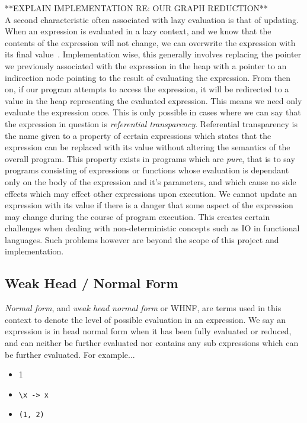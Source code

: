 **EXPLAIN IMPLEMENTATION RE: OUR GRAPH REDUCTION**  \\


A second characteristic often associated with lazy evaluation is that of 
updating. When an expression is evaluated in a lazy context, and we know
that the contents of the expression will not change, we can overwrite the
expression with its final value~\cite[pp.208]{SPJ}. Implementation wise, this generally involves
replacing the pointer we previously associated with the expression in the
heap with a pointer to an indirection node pointing to the result of 
evaluating the expression. From then on, if our program attempts to 
access the expression, it will be redirected to a value in the heap 
representing the evaluated expression. This means we need only evaluate
the expression once. This is only possible in cases where
we can say that the expression in question is \emph{referential transparency}. 
Referential transparency is the name
given to a property of certain expressions which states that the expression
can be replaced with its value without altering the semantics of the overall
program. This property exists in programs which are \emph{pure}, that is to
say programs consisting of expressions or functions whose evaluation is 
dependant only on the body of the expression and it's parameters, and which
cause no side effects which may effect other expressions upon execution. 
We cannot update an expression with its value if there is a danger that
some aspect of the expression may change during the course of program 
execution. This creates certain challenges when dealing with non-deterministic
concepts such as IO in functional languages. Such problems however are 
beyond the scope of this project and implementation.

\subsection{Weak Head / Normal Form}
\emph{Normal form}, and \emph{weak head normal form} or WHNF, are terms used
in this context to denote the level of possible evaluation in an expression.
We say an expression is in head normal form when it has been fully evaluated
or reduced, and can neither be further evaluated nor contains any sub
expressions which can be further evaluated. For example...

\begin{itemize}
 \item 1
 \item \verb!\x -> x!
 \item \verb!(1, 2)!
\end{itemize}

